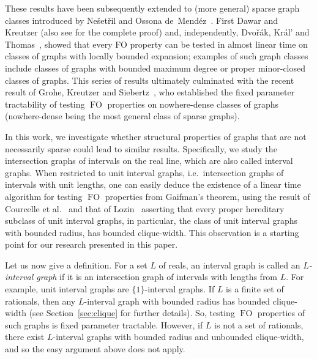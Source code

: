 \documentclass{CSML}
\newcommand{\FO}{\ensuremath{\operatorname{FO}}\xspace}
\theoremstyle{plain}\newtheorem{claim}[thm]{Claim}
\begin{document}
These results have been subsequently extended to (more general) sparse graph classes
introduced by Ne\v{s}et\v{r}il and Ossona de~Mend\'ez~\cite{no08i,no08ii,no08iii}. First Dawar and Kreutzer \cite{dk09}
(also see \cite{gk11} for the complete proof) and, independently,
Dvo\v{r}\'ak, Kr\'al' and Thomas~\cite{dkt10}, showed that every
FO property can be tested in almost linear time on classes of
graphs with locally bounded expansion; examples of such graph classes
include classes of graphs with bounded maximum degree or proper minor-closed
classes of graphs. This series of results ultimately culminated with the recent result of Grohe, Kreutzer and
Siebertz~\cite{GKS14}, who established the fixed parameter tractability of
testing \FO properties on nowhere-dense classes of graphs (nowhere-dense
being the most general class of sparse graphs).

In this work, we investigate whether structural properties of graphs that are not necessarily sparse could lead to similar results.
Specifically, we study the intersection graphs of intervals on the real line,
which are also called interval graphs. 
When restricted to unit interval graphs,
i.e.~intersection graphs of intervals with unit lengths,
one can easily deduce the existence of a linear time algorithm
for testing \FO properties from Gaifman's theorem, using the result of Courcelle et al.~\cite{cmr00} and
that of Lozin~\cite{loz08} asserting that every proper hereditary subclass of
unit interval graphs, in particular, the class of unit interval graphs
with bounded radius, has bounded clique-width.
This observation is a starting point for our research presented
in this paper.

Let us now give a definition. For a set $L$ of reals,
an interval graph is called an {\em$L$-interval graph} if it is an intersection
graph of intervals with lengths from $L$. For example, unit interval graphs
are $\{1\}$-interval graphs.
If $L$ is a finite set of rationals, then any $L$-interval graph
with bounded radius has bounded clique-width (see Section~\ref{sec:clique} for further details).
So, testing \FO properties of such graphs is fixed parameter tractable.
However, if $L$ is not a set of rationals, there exist $L$-interval graphs
with bounded radius and unbounded clique-width, 
and so the easy argument above does not apply.
\end{document}
